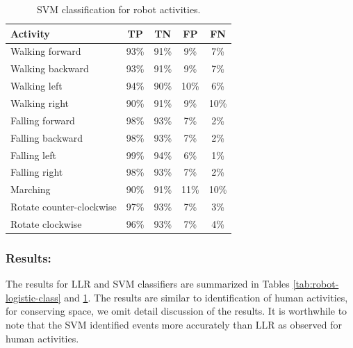 \documentclass[letterpaper]{article}
\begin{document}
\begin{sloppy}
\begin{table}[!ht]
\caption{SVM classification for robot activities.}
	\label{tab:robot-svm-class}
	\centering
		\begin{tabular} {| l | c | c | c | c | }
		\hline
			{\bf Activity} & {\bf  TP}  &	{\bf TN}  &	{\bf FP} &	{\bf FN} \\ 
\hline
			Walking forward	& 93\%	& 91\%	& 9\%	& 7\% \\ \hline
			Walking backward	& 93\%	& 91\%	& 9\%	& 7\% \\ \hline
			Walking left	& 94\%	& 90\%	& 10\%	& 6\% \\ \hline
			Walking right	& 90\%	& 91\%	& 9\%	& 10\% \\ \hline
			Falling forward	& 98\%	& 93\%	& 7\%	& 2\%	 \\ \hline
			Falling backward	& 98\%	& 93\%	& 7\%	& 2\%	 \\ \hline
			Falling left	& 99\%	& 94\%	& 6\%	& 1\%	 \\ \hline
			Falling right	& 98\%	& 93\%	& 7\%	& 2\%	 \\ \hline
			Marching	& 90\%	& 91\%	& 11\%	& 10\%	 \\ \hline
			Rotate counter-clockwise	& 97\%	& 93\%	& 7\%	& 3\%	 \\ \hline
			Rotate clockwise	& 96\%	& 93\%	& 7\%	& 4\%	 \\ \hline
		\end{tabular}
\end{table}


\subsubsection{Results:}

The results for LLR and SVM classifiers are summarized in Tables \ref{tab:robot-logistic-class} and 
\ref{tab:robot-svm-class}. The results are similar to identification of human activities, for 
conserving space, we omit detail discussion of the results. It is worthwhile to note that the SVM 
 identified events more accurately than LLR as observed for human activities.  





\end{sloppy}
\end{document}
